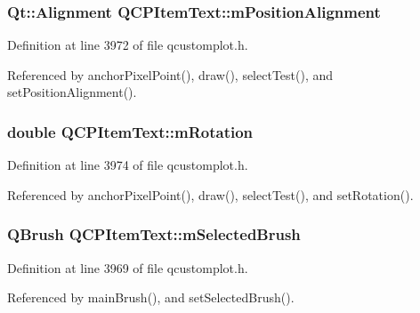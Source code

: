 \subsubsection[{m\+Position\+Alignment}]{\setlength{\rightskip}{0pt plus 5cm}Qt\+::\+Alignment Q\+C\+P\+Item\+Text\+::m\+Position\+Alignment\hspace{0.3cm}{\ttfamily [protected]}}\label{class_q_c_p_item_text_a6c27f7dc1a962a04b32430cf99f04654}


Definition at line 3972 of file qcustomplot.\+h.



Referenced by anchor\+Pixel\+Point(), draw(), select\+Test(), and set\+Position\+Alignment().

\hypertarget{class_q_c_p_item_text_ac37df0061552225d2277e1ee3b48f2cb}{}
\subsubsection[{m\+Rotation}]{\setlength{\rightskip}{0pt plus 5cm}double Q\+C\+P\+Item\+Text\+::m\+Rotation\hspace{0.3cm}{\ttfamily [protected]}}\label{class_q_c_p_item_text_ac37df0061552225d2277e1ee3b48f2cb}


Definition at line 3974 of file qcustomplot.\+h.



Referenced by anchor\+Pixel\+Point(), draw(), select\+Test(), and set\+Rotation().

\hypertarget{class_q_c_p_item_text_a28ccd097b42a216d81db9c6869f54a59}{}
\subsubsection[{m\+Selected\+Brush}]{\setlength{\rightskip}{0pt plus 5cm}Q\+Brush Q\+C\+P\+Item\+Text\+::m\+Selected\+Brush\hspace{0.3cm}{\ttfamily [protected]}}\label{class_q_c_p_item_text_a28ccd097b42a216d81db9c6869f54a59}


Definition at line 3969 of file qcustomplot.\+h.



Referenced by main\+Brush(), and set\+Selected\+Brush().

